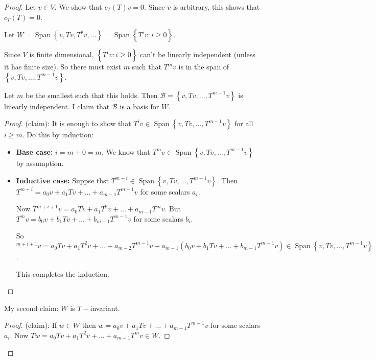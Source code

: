 \documentclass{article}
\theoremstyle{definition} \newtheorem*{definition}{Definition}
\newcommand{\B}{\mathcal{B}}
\DeclareMathOperator{\Span}{Span}
\begin{document}
  \begin{proof}
    Let $v \in V$. We show that $c_T(T)v = 0$. Since $v$ is arbitrary,
    this shows that $c_T(T) = 0$.

    Let $W = \Span\left\{ v, Tv, T^2v, \dots \right\} = 
    \Span\left\{ T^i v : i \geq 0 \right\}$.

    Since $V$ is finite dimensional, $\left\{ T^i v : i \geq 0 \right\}$
    can't be linearly independent (unless it has finite size).
    So there must exist $m$ such that $T^mv$ is in the span of 
    $\left\{ v, Tv, \dots , T^{m-1}v \right\}$.

    Let $m$ be the smallest such that this holds. Then 
    $\B=\left\{ v, Tv, \dots, T^{m-1}v\right\}$ is linearly independent. 
    I claim that $\B$ is a basis for $W$.

    \begin{proof}
      (claim): It is enough to show that $T^iv \in \Span\left\{ 
       v, Tv, \dots, T^{m-1}v
      \right\}$ for all $i \geq m$. Do this by induction:

      \begin{itemize}
        \item \textbf{Base case:} $i = m+0 = m$. We know that
          $T^mv \in \Span\left\{ v, Tv, \dots, T^{m-1}v \right\}$ by
          assumption.
        \item \textbf{Inductive case:} Suppse thst $T^{m+i}\in \Span\left\{ v, Tv, \dots, T^{m-1}v \right\}$. Then $T^{m+i} = 
          a_0v + a_1Tv + \dots + a_{m-1}T^{m-1}v$ for some scalars $a_i$.

          Now $T^{m+i+1}v = a_0 Tv + a_1T^2v + \dots + a_{m-1}T^mv$.
          But $T^mv = b_0v + b_1Tv + \dots + b_{m-1}T^{m-1}v$ for
          some scalars $b_i$.

          So $^{m+i+1}v = a_0 Tv + a_1T^2v + \dots + a_{m-2}T^{m-1}v
          + a_{m-1}(b_0 v + b_1 Tv + \dots + b_{m-1}T^{m-1}v)
          \in \Span\left\{ v, Tv, \dots, T^{m-1}v \right\}$.

          This completes the induction.
      \end{itemize}
    \end{proof}

    My second claim: $W$ is $T-$invariant. 
    
    \begin{proof}
      (claim):
      If $w\in W$ then $w = a_0v + a_1Tv + \dots + a_{m-1}T^{m-1}v$ for 
      some scalars $a_i$. Now
      $Tw = a_0 Tv + a_1 T^2v + \dots + a_{m-1}T^mv \in W$.
    \end{proof}


\end{proof}
\end{document}
